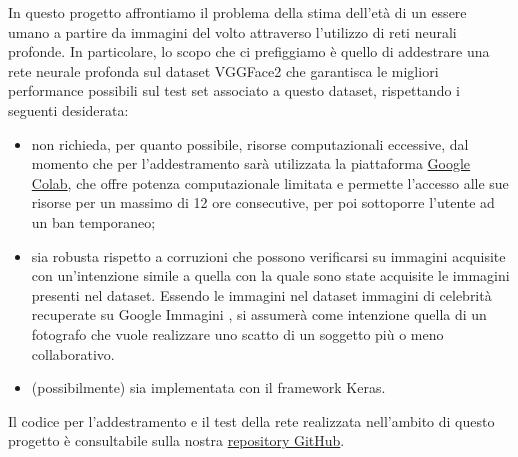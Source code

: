 In questo progetto affrontiamo il problema della stima dell'età di un essere umano a partire da immagini del volto attraverso l'utilizzo di reti neurali profonde. 
In particolare, lo scopo che ci prefiggiamo è quello di addestrare una rete neurale profonda sul dataset VGGFace2 \cite{vggface2dataset} che garantisca le migliori performance possibili sul test set associato a questo dataset, rispettando i seguenti desiderata:

\begin{itemize}
	\item non richieda, per quanto possibile, risorse computazionali eccessive, dal momento che per l'addestramento sarà utilizzata la piattaforma \href{https://colab.research.google.com/notebooks/intro.ipynb}{Google Colab}, che offre potenza computazionale limitata e permette l'accesso alle sue risorse per un massimo di 12 ore consecutive, per poi sottoporre l'utente ad un ban temporaneo;
	\item sia robusta rispetto a corruzioni che possono verificarsi su immagini acquisite con un'intenzione simile a quella con la quale sono state acquisite le immagini presenti nel dataset.
Essendo le immagini nel dataset immagini di celebrità recuperate su Google Immagini \cite{vggface2dataset}, si assumerà come intenzione quella di un fotografo che vuole realizzare uno scatto di un soggetto più o meno collaborativo.
	\item (possibilmente) sia implementata con il framework Keras.
\end{itemize}

Il codice per l’addestramento e il test della rete realizzata nell’ambito di questo progetto è consultabile sulla nostra \href{https://github.com/MicheleOliva/Contest-Vision-2020}{repository GitHub}. 
